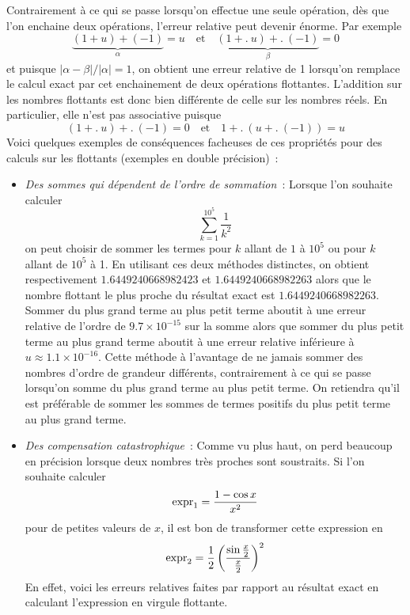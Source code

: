 \documentclass{article}
\newcommand{\abs}[1]{\left|#1\right|}
\newcommand{\p}[1]{\left(#1\right)}
\begin{document}
Contrairement à ce qui se passe lorsqu'on effectue une seule opération,
dès que l'on enchaine deux opérations, l'erreur relative peut devenir énorme.
Par exemple
\[\underbrace{(1+u)+(-1)}_{\alpha} = u \quad\text{et}\quad
  \underbrace{(1 +\!\!.\ u) +\!\!.\ (-1)}_{\beta} = 0\]
et puisque $\abs{\alpha-\beta}/\abs{\alpha} = 1$, on obtient une erreur relative
de 1 lorsqu'on remplace le calcul exact par cet enchainement de deux opérations
flottantes. L'addition sur les nombres flottants est donc bien différente de
celle sur les nombres réels. En particulier, elle n'est pas associative puisque
\[(1 +\!\!.\ u) +\!\!.\ (-1) = 0 \quad\text{et}\quad
  1 +\!\!.\ (u +\!\!.\ (-1)) = u\]
Voici quelques exemples de conséquences facheuses de ces propriétés pour des
calculs sur les flottants (exemples en double précision)~:
\begin{itemize}
  \item \emph{Des sommes qui dépendent de l'ordre de sommation}~: Lorsque l'on
	  souhaite calculer
		\[\sum_{k=1}^{10^5} \frac{1}{k^2}\]
		on peut choisir de sommer les termes pour $k$ allant de $1$ à $10^5$ ou
		pour $k$ allant de $10^5$ à 1. En utilisant ces deux méthodes distinctes, 
		on obtient respectivement $1.6449240668982423$ et $1.6449240668982263$
		alors que le nombre flottant le plus proche du résultat exact est
		$1.6449240668982263$. Sommer du plus grand terme au plus petit terme
		aboutit à une erreur relative de l'ordre de $9.7\times 10^{-15}$ sur
		la somme alors que sommer du plus petit terme au plus grand terme
		aboutit à une erreur relative inférieure à $u\approx 1.1 \times 10^{-16}$.
		Cette méthode à l'avantage de ne jamais sommer des nombres d'ordre de
		grandeur différents, contrairement à ce qui se passe lorsqu'on somme
		du plus grand terme au plus petit terme. On retiendra qu'il est préférable
		de sommer les sommes de termes positifs du plus petit terme au plus grand
		terme.
	\item \emph{Des compensation catastrophique}~: Comme vu plus haut, on perd
  	beaucoup en précision lorsque deux nombres très proches sont soustraits.
		Si l'on souhaite calculer
		\[{\rm expr}_1=\frac{1-\cos x}{x^2}\]
		pour de petites valeurs de $x$, il est bon de transformer cette expression
		en
		\[{\rm expr}_2=\frac{1}{2}\p{\frac{\sin\frac{x}{2}}{\frac{x}{2}}}^2\]
		En effet, voici les erreurs relatives faites par rapport au résultat exact
		en calculant l'expression en virgule flottante.\\
		\begin{center}
		\begin{tabular}{|c|c|c|}

\end{tabular}
\end{center}
\end{itemize}
\end{document}
